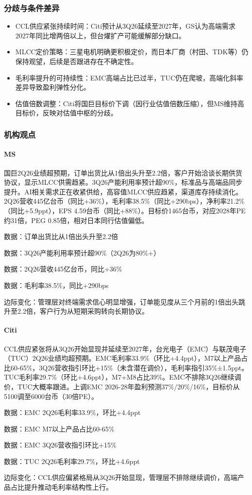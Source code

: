 \documentclass[11pt]{ctexart}
\begin{document}
\subsubsection*{分歧与条件差异}
\begin{itemize}
  \item CCL供应紧张持续时间：Citi预计从3Q26延续至2027年，GS认为高端需求2027年同比增两倍以上，但台燿扩产可能缓解部分缺口。
  \item MLCC定价策略：三星电机明确更积极定价，而日本厂商（村田、TDK等）仍保持观望，后续是否跟进存在不确定性。
  \item 毛利率提升的可持续性：EMC高端占比已过半，TUC仍在爬坡，高端化斜率差异导致盈利弹性分化。
  \item 估值倍数调整：Citi将国巨目标价下调（因行业估值倍数压缩），但MS维持高目标价，反映对估值中枢的分歧。
\end{itemize}
\subsubsection*{机构观点}
\paragraph{MS} 国巨2Q26业绩超预期，订单出货比从1倍出头升至2.2倍，客户开始洽谈长期供货协议，显示MLCC供需趋紧。3Q26产能利用率预计超90\%，标准品与高端品同步提升。AI相关需求正在收紧供给，高容值MLCC供应趋紧，渠道库存持续消化。2Q26营收445亿台币（同比+36\%），毛利率38.5\%（同比+290bps），净利率21.2\%（同比+5.9ppt），EPS 4.59台币（同比+88\%）。目标价1465台币，对应2028年PE约31倍，PEG 0.85倍，相对日本同行估值偏低。
{\small\color{refgray}数据：订单出货比从1倍出头升至2.2倍\par}
{\small\color{refgray}数据：3Q26产能利用率预计超90\%（2Q26为80\%+）\par}
{\small\color{refgray}数据：2Q26营收445亿台币，同比+36\%\par}
{\small\color{refgray}数据：毛利率38.5\%，同比+290bps\par}
{\small\color{refgray}边际变化：管理层对终端需求信心明显增强，订单能见度从三个月前的1倍出头跳升至2.2倍，客户行为从短期采购转向长期协议。\par}
\paragraph{Citi} CCL供应紧张将从3Q26开始显现并延续至2027年，台光电子（EMC）与联茂电子（TUC）2Q26业绩均超预期。EMC毛利率33.9\%（环比+4.4ppt），M7以上产品占比60-65\%，3Q26营收指引环比+15\%（未含潜在调价），毛利率指引35\%±1.5ppt。TUC毛利率29.7\%（环比+4.6ppt），M7+M8占比39\%。EMC不排除3Q26继续调价，TUC大概率跟进。上调EMC 2026-28年盈利预测37\%/20\%/16\%，目标价从5100调至6000台币（30倍PE）。
{\small\color{refgray}数据：EMC 2Q26毛利率33.9\%，环比+4.4ppt\par}
{\small\color{refgray}数据：EMC M7以上产品占比60-65\%\par}
{\small\color{refgray}数据：EMC 3Q26营收指引环比+15\%\par}
{\small\color{refgray}数据：TUC 2Q26毛利率29.7\%，环比+4.6ppt\par}
{\small\color{refgray}边际变化：CCL供应偏紧格局从3Q26开始显现，管理层不排除继续调价，高端产品占比提升推动毛利率结构性上行。\par}
\end{document}

